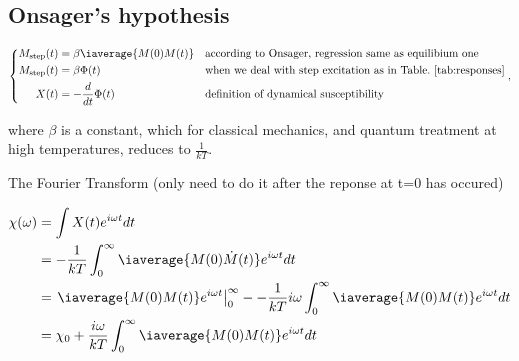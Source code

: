  \newpage \subsection{Onsager's hypothesis}
    \begin{equation}\label{key}
    	\left\lbrace\begin{aligned}
    		M_\text{step}(t) & = \beta\iaverage{M(0)M(t)} && \text{according to Onsager, regression same as equilibium one}\\
	    	M_\text{step}(t) & = \beta\Phi(t) && \text{when we deal with step excitation as in Table.~\ref{tab:responses}}\\
	    	X(t) & = -\frac{d}{dt}\Phi(t) && \text{definition of dynamical susceptibility}
    	\end{aligned}\right.,
    \end{equation}
    
    \noindent where $ \beta $ is a constant, which for classical mechanics, and quantum treatment at high temperatures, reduces to $ \frac{1}{kT} $.
    
    The Fourier Transform (only need to do it after the reponse at t=0 has occured)
    
    \begin{equation}\label{eqn:susceptibility_from_response_0}
    	\begin{aligned}
	    	\chi(\omega) & = \int X(t)e^{i\omega t} dt\\
	    	& = -\frac{1}{kT}\int_0^\infty\iaverage{M(0)\dot{M}(t)}e^{i\omega t}dt\\
	    	& = \left.\iaverage{M(0)M(t)}e^{i\omega t} \right|_0^\infty - - \frac{1}{kT}i\omega\int_{0}^\infty\iaverage{M(0)M(t)}e^{i\omega t}dt\\
	    	& = \chi_0 + \frac{i\omega}{kT}\int_{0}^\infty\iaverage{M(0)M(t)}e^{i\omega t}dt\\
    	\end{aligned}
    \end{equation}
  
